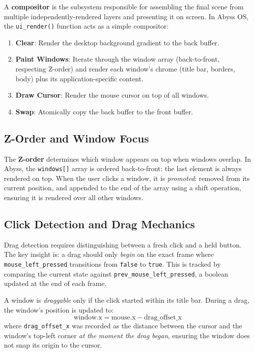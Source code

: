 \documentclass[12pt,a4paper]{report}
\begin{document}
A \textbf{compositor} is the subsystem responsible for assembling the final scene from
multiple independently-rendered layers and presenting it on screen. In Abyss OS, the
\texttt{ui\_render()} function acts as a simple compositor:

\begin{enumerate}
    \item \textbf{Clear}: Render the desktop background gradient to the back buffer.
    \item \textbf{Paint Windows}: Iterate through the window array (back-to-front,
    respecting Z-order) and render each window's chrome (title bar, borders, body)
    plus its application-specific content.
    \item \textbf{Draw Cursor}: Render the mouse cursor on top of all windows.
    \item \textbf{Swap}: Atomically copy the back buffer to the front buffer.
\end{enumerate}

\subsection{Z-Order and Window Focus}

The \textbf{Z-order} determines which window appears on top when windows overlap.
In Abyss, the \texttt{windows[]} array is ordered back-to-front: the last element
is always rendered on top. When the user clicks a window, it is \textit{promoted}:
removed from its current position, and appended to the end of the array using a
shift operation, ensuring it is rendered over all other windows.

\subsection{Click Detection and Drag Mechanics}

Drag detection requires distinguishing between a fresh click and a held button.
The key insight is: a drag should only \textit{begin} on the exact frame where
\texttt{mouse\_left\_pressed} transitions from \texttt{false} to \texttt{true}.
This is tracked by comparing the current state against \texttt{prev\_mouse\_left\_pressed},
a boolean updated at the end of each frame.

A window is \textit{draggable} only if the click started within its title bar. During
a drag, the window's position is updated to:
\[
\text{window.x} = \text{mouse.x} - \text{drag\_offset\_x}
\]
where \texttt{drag\_offset\_x} was recorded as the distance between the cursor and the
window's top-left corner \textit{at the moment the drag began}, ensuring the window
does not snap its origin to the cursor.
\end{document}
